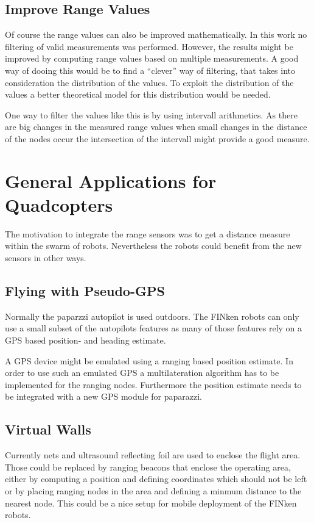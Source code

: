 \subsection{Improve Range Values}

Of course the range values can also be improved mathematically.
In this work no filtering of valid measurements was performed.
However, the results might be improved by computing range values based on multiple measurements.
A good way of dooing this would be to find a “clever” way of filtering, that takes into consideration the distribution of the values.
To exploit the distribution of the values a better theoretical model for this distribution would be needed.

One way to filter the values like this is by using intervall arithmetics.
As there are big changes in the measured range values when small changes in the distance of the nodes occur the intersection of the intervall might provide a good measure.




\section{General Applications for Quadcopters}

The motivation to integrate the range sensors was to get a distance measure within the swarm of robots.
Nevertheless the robots could benefit from the new sensors in other ways.

\subsection{Flying with Pseudo-GPS}
Normally the paparzzi autopilot is used outdoors.
The FINken robots can only use a small subset of the autopilots features as many of those features rely on a GPS based position- and heading estimate.

A GPS device might be emulated using a ranging based position estimate.
In order to use such an emulated GPS a multilateration algorithm has to be implemented for the ranging nodes.
Furthermore the position estimate needs to be integrated with a new GPS module for paparazzi.


\subsection{Virtual Walls}
\label{boundingbox}
Currently nets and ultrasound reflecting foil are used to enclose the flight area.
Those could be replaced by ranging beacons that enclose the operating area, either by computing a position and defining coordinates which should not be left or by placing ranging nodes in the area and defining a minmum distance to the nearest node.
This could be a nice setup for mobile deployment of the FINken robots.



